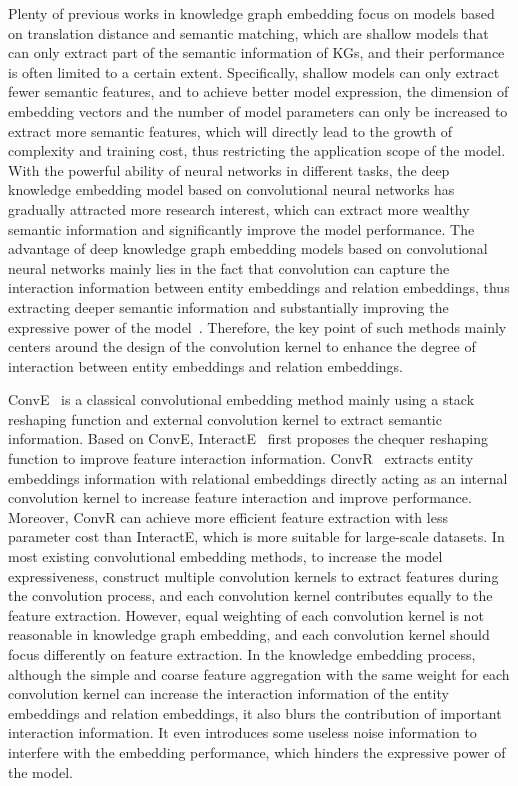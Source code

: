 \documentclass[letterpaper]{article} %
\begin{document}
Plenty of previous works in knowledge graph embedding focus on models based on translation distance and semantic matching, which are shallow models that can only extract part of the semantic information of KGs, and their performance is often limited to a certain extent. Specifically, shallow models can only extract fewer semantic features, and to achieve better model expression, the dimension of embedding vectors and the number of model parameters can only be increased to extract more semantic features, which will directly lead to the growth of complexity and training cost, thus restricting the application scope of the model. With the powerful ability of neural networks in different tasks, the deep knowledge embedding model based on convolutional neural networks has gradually attracted more research interest, which can extract more wealthy semantic information and significantly improve the model performance. The advantage of deep knowledge graph embedding models based on convolutional neural networks mainly lies in the fact that convolution can capture the interaction information between entity embeddings and relation embeddings, thus extracting deeper semantic information and substantially improving the expressive power of the model~\cite{InteractE}. Therefore, the key point of such methods mainly centers around the design of the convolution kernel to enhance the degree of interaction between entity embeddings and relation embeddings.

ConvE~\cite{ConvE} is a classical convolutional embedding method mainly using a stack reshaping function and external convolution kernel to extract semantic information. Based on ConvE, InteractE~\cite{InteractE} first proposes the chequer reshaping function to improve feature interaction information. ConvR~\cite{ConvR} extracts entity embeddings information with relational embeddings directly acting as an internal convolution kernel to increase feature interaction and improve performance. Moreover, ConvR can achieve more efficient feature extraction with less parameter cost than InteractE, which is more suitable for large-scale datasets. In most existing convolutional embedding methods, to increase the model expressiveness, construct multiple convolution kernels to extract features during the convolution process, and each convolution kernel contributes equally to the feature extraction. However, equal weighting of each convolution kernel is not reasonable in knowledge graph embedding, and each convolution kernel should focus differently on feature extraction. In the knowledge embedding process, although the simple and coarse feature aggregation with the same weight for each convolution kernel can increase the interaction information of the entity embeddings and relation embeddings, it also blurs the contribution of important interaction information. It even introduces some useless noise information to interfere with the embedding performance, which hinders the expressive power of the model.
\end{document}

